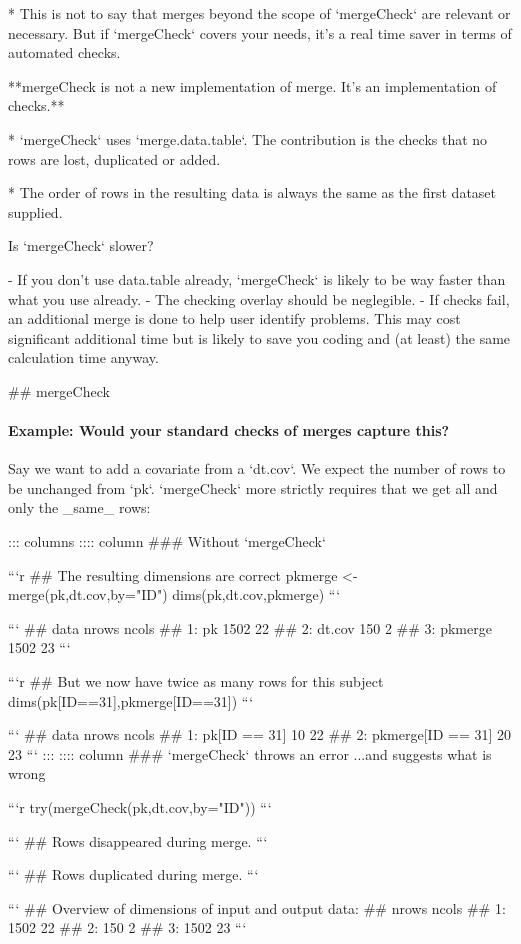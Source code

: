 * This is not to say that merges beyond the scope of `mergeCheck` are
relevant or necessary. But if `mergeCheck` covers your needs, it's a
real time saver in terms of automated checks.

**mergeCheck is not a new implementation of merge. It's an implementation of checks.**

* `mergeCheck` uses `merge.data.table`. The contribution is the checks that no rows are lost, duplicated or added. 

* The order of rows in the resulting data is always the same as the first dataset supplied.

Is `mergeCheck` slower?

- If you don't use data.table already, `mergeCheck` is likely to be way faster than what you use already. 
- The checking overlay should be neglegible.
- If checks fail, an additional merge is done to help user identify problems. This may cost significant additional time but is likely to save you coding and (at least) the same calculation time anyway.


## mergeCheck
\framesubtitle{Example: Would your standard checks of merges capture this?}



Say we want to add a covariate from a
`dt.cov`.  We expect the number of rows to be unchanged from `pk`. `mergeCheck` more strictly requires that we get all and only the _same_ rows:

::: columns
:::: column
### Without `mergeCheck`
\footnotesize

```r
## The resulting dimensions are correct
pkmerge <- merge(pk,dt.cov,by="ID")
dims(pk,dt.cov,pkmerge)
```

```
##       data nrows ncols
## 1:      pk  1502    22
## 2:  dt.cov   150     2
## 3: pkmerge  1502    23
```

```r
## But we now have twice as many rows for this subject
dims(pk[ID==31],pkmerge[ID==31])
```

```
##                 data nrows ncols
## 1:      pk[ID == 31]    10    22
## 2: pkmerge[ID == 31]    20    23
```
:::
:::: column
### `mergeCheck` throws an error
...and suggests what is wrong
\footnotesize


```r
try(mergeCheck(pk,dt.cov,by="ID")) 
```

```
## Rows disappeared during merge.
```

```
## Rows duplicated during merge.
```

```
## Overview of dimensions of input and output data:
##    nrows ncols
## 1:  1502    22
## 2:   150     2
## 3:  1502    23
```


